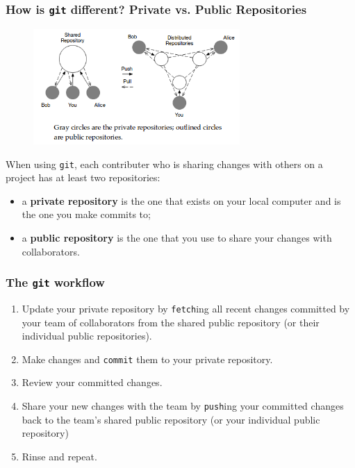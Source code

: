 \documentclass{beamer}
\begin{document}
\begin{frame}
   \frametitle{How is \texttt{git} different? Private vs. Public Repositories}
   \begin{figure}[htbp]
      \includegraphics[width=0.7\textwidth]{images/shared-vs-distributed-repository-layout.png}
   \end{figure}
   \vspace{-1.0em}
   When using \texttt{git}, each contributer who is sharing changes with
   others on a project has at least two repositories: \\
   \begin{itemize}
      \setlength\itemsep{0.5em}
      \item a \textbf{private repository} is the one that exists on your 
         local computer and is the one you make commits to;
      \item a \textbf{public repository} is the one that you use to 
         share your changes with collaborators.
   \end{itemize}
\end{frame}

\begin{frame}
   \frametitle{The \texttt{git} workflow}
   \begin{enumerate}
      \setlength\itemsep{1.0em}
      \item Update your private repository by \texttt{fetch}ing all recent 
         changes committed by your team of collaborators from the shared 
         public repository (or their individual public repositories).
      \item Make changes and \texttt{commit} them to your private repository.
      \item Review your committed changes.
      \item Share your new changes with the team by \texttt{push}ing your 
         committed changes back to the team's shared public repository 
         (or your individual public repository)
      \item Rinse and repeat. 
   \end{enumerate}
\end{frame}
\end{document}
